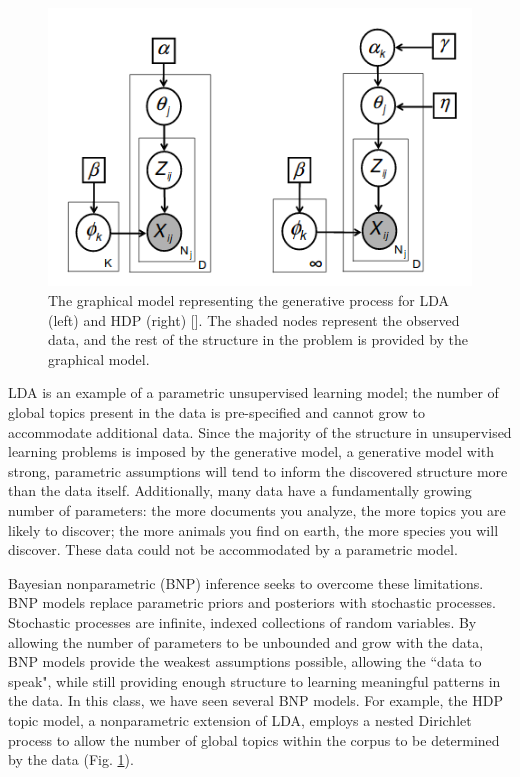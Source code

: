 \documentclass[twoside]{article}
\begin{document}
\begin{figure}[h]
  \centering
    \includegraphics[scale=0.40]{hdp_lda}
    \caption{The graphical model representing the generative process for LDA (left) and HDP (right) [\citet{Newman}]. The shaded nodes represent the observed data, and the rest of the structure in the problem is provided by the graphical model.}
  \label{fig:graph}
\end{figure}

LDA is an example of a parametric unsupervised learning model; the number of global topics present in the data is pre-specified and cannot grow to accommodate additional data. Since the majority of the structure in unsupervised learning problems is imposed by the generative model, a generative model with strong, parametric assumptions will tend to inform the discovered structure more than the data itself. Additionally, many data have a fundamentally growing number of parameters: the more documents you analyze, the more topics you are likely to discover; the more animals you find on earth, the more species you will discover. These data could not be accommodated by a parametric model.

Bayesian nonparametric (BNP) inference seeks to overcome these limitations.  BNP models replace parametric priors and posteriors with stochastic processes. Stochastic processes are infinite, indexed collections of random variables. By allowing the number of parameters to be unbounded and grow with the data, BNP models provide the weakest assumptions possible, allowing the ``data to speak", while still providing enough structure to learning meaningful patterns in the data. In this class, we have seen several BNP models. For example, the HDP topic model, a nonparametric extension of LDA, employs a nested Dirichlet process to allow the number of global topics within the corpus to be determined by the data (Fig. \ref{fig:graph}). 
\end{document}

